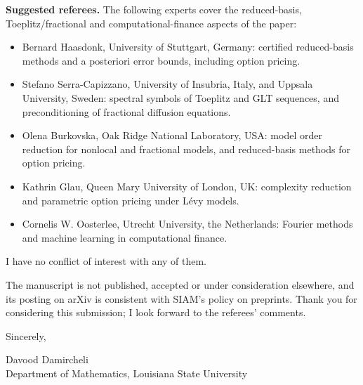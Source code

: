 \documentclass[11pt]{article}
\begin{document}
\textbf{Suggested referees.} The following experts cover the reduced-basis, Toeplitz/fractional and
computational-finance aspects of the paper:
\begin{itemize}[leftmargin=1.6em,itemsep=0.1em,topsep=0.2em]
\item Bernard Haasdonk, University of Stuttgart, Germany: certified reduced-basis methods and
a posteriori error bounds, including option pricing.
\item Stefano Serra-Capizzano, University of Insubria, Italy, and Uppsala University, Sweden: spectral
symbols of Toeplitz and GLT sequences, and preconditioning of fractional diffusion equations.
\item Olena Burkovska, Oak Ridge National Laboratory, USA: model order reduction for nonlocal and
fractional models, and reduced-basis methods for option pricing.
\item Kathrin Glau, Queen Mary University of London, UK: complexity reduction and parametric
option pricing under L\'evy models.
\item Cornelis W. Oosterlee, Utrecht University, the Netherlands: Fourier methods and machine
learning in computational finance.
\end{itemize}
I have no conflict of interest with any of them.

The manuscript is not published, accepted or under consideration elsewhere, and its posting on
arXiv is consistent with SIAM's policy on preprints. Thank you for considering this submission; I look
forward to the referees' comments.

Sincerely,

\vspace{0.6em}
Davood Damircheli\\
Department of Mathematics, Louisiana State University
\end{document}
